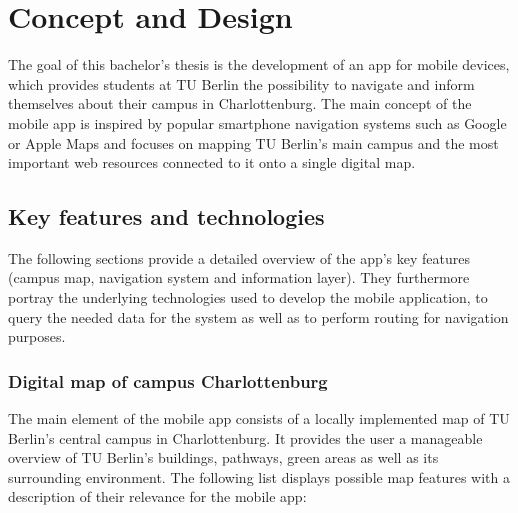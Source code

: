 \chapter{Concept and Design}
\label{cha:conceptanddesign}
The goal of this bachelor's thesis is the development of an app for mobile devices, which provides students at TU Berlin the possibility to navigate and inform themselves about their campus in Charlottenburg. The main concept of the mobile app is inspired by popular smartphone navigation systems such as Google or Apple Maps and focuses on mapping TU Berlin's main campus and the most important web resources connected to it onto a single digital map.

\section{Key features and technologies}
The following sections provide a detailed overview of the app's key features (campus map, navigation system and information layer). They furthermore portray the underlying technologies used to develop the mobile application, to query the needed data for the system as well as to perform routing for navigation purposes.

\subsection{Digital map of campus Charlottenburg} \label{campus_map_1}
The main element of the mobile app consists of a locally implemented map of TU Berlin's central campus in Charlottenburg. It provides the user a manageable overview of TU Berlin's buildings, pathways, green areas as well as its surrounding environment. The following list displays possible map features with a description of their relevance for the mobile app:

